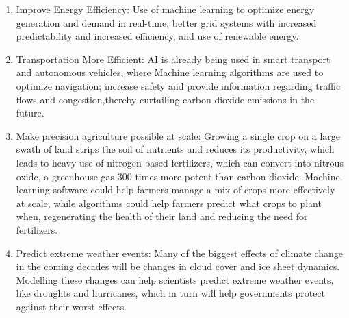\documentclass[12pt]{article}
\begin{document}
\begin{enumerate}

\item Improve Energy Efficiency:
Use of machine learning to optimize energy generation and demand in real-time; better grid systems with increased predictability and increased efficiency, and use of renewable energy. 

\item Transportation More Efficient: 
AI is already being used in smart transport and autonomous vehicles, where Machine learning algorithms are used to optimize navigation; increase safety and provide information regarding traffic flows and congestion,thereby curtailing carbon dioxide emissions in the future. 


\item Make precision agriculture possible at scale: 
Growing a single crop on a large swath of land strips the soil of nutrients and reduces its productivity, which leads to heavy use of nitrogen-based fertilizers, which can convert into nitrous oxide, a greenhouse gas 300 times more potent than carbon dioxide. Machine-learning software could help farmers manage a mix of crops more effectively at scale, while algorithms could help farmers predict what crops to plant when, regenerating the health of their land and reducing the need for fertilizers.

\item Predict extreme weather events: Many of the biggest effects of climate change in the coming decades will be changes in cloud cover and ice sheet dynamics. Modelling these changes can help scientists predict extreme weather events, like droughts and hurricanes, which in turn will help governments protect against their worst effects.


\end{enumerate}
\end{document}
